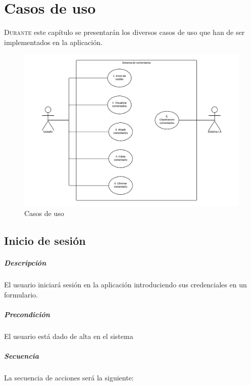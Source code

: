 
\chapter{Casos de uso}\label{chap:cu}

\lettrine{D}{urante} este capítulo se presentarán los diversos casos de uso que han de ser implementados en la aplicación.

\begin{figure}[!ht]
	\centering
	\includegraphics[width=1\textwidth]{imaxes/usecases.png}
	\caption{Casos de uso}
		\label{usecases}
\end{figure}

\section{Inicio de sesión}

\paragraph{Descripción} El usuario iniciará sesión en la aplicación introduciendo sus credenciales en un formulario.

\paragraph{Precondición} El usuario está dado de alta en el sistema

\paragraph{Secuencia} La secuencia de acciones será la siguiente:

